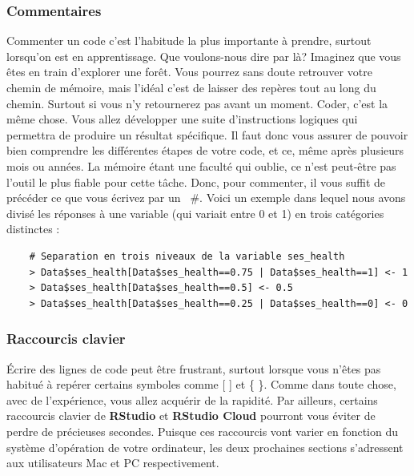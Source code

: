 \documentclass[10.5pt,a4paper]{article}
\newcommand{\rcode}[1]{\texttt{\color{rstudio} #1}}
\begin{document}
    \subsubsection{Commentaires}
    
    Commenter un code c'est l'habitude la plus importante à prendre, surtout lorsqu'on est en apprentissage. Que voulons-nous dire par là? Imaginez que vous êtes en train d'explorer une forêt. Vous pourrez sans doute retrouver votre chemin de mémoire, mais l'idéal c'est de laisser des repères tout au long du chemin. Surtout si vous n'y retournerez pas avant un moment. Coder, c'est la même chose. Vous allez développer une suite d'instructions logiques qui permettra de produire un résultat spécifique. Il faut donc vous assurer de pouvoir bien comprendre les différentes étapes de votre code, et ce, même après plusieurs mois ou années. La mémoire étant une faculté qui oublie, ce n'est peut-être pas l'outil le plus fiable pour cette tâche. Donc, pour commenter, il vous suffit de précéder ce que vous écrivez par un \rcode{$\#$}. Voici un exemple dans lequel nous avons divisé les réponses à une variable (qui variait entre 0 et 1) en trois catégories distinctes :
    
    \begin{lstlisting}
    # Separation en trois niveaux de la variable ses_health
    > Data$ses_health[Data$ses_health==0.75 | Data$ses_health==1] <- 1 
    > Data$ses_health[Data$ses_health==0.5] <- 0.5
    > Data$ses_health[Data$ses_health==0.25 | Data$ses_health==0] <- 0
    \end{lstlisting}
    
    \subsubsection{Raccourcis clavier}
    
   Écrire des lignes de code peut être frustrant, surtout lorsque vous n'êtes pas habitué à repérer certains symboles comme [ ] et \{ \}. Comme dans toute chose, avec de l'expérience, vous allez acquérir de la rapidité. Par ailleurs, certains raccourcis clavier de \textbf{RStudio} et \textbf{RStudio Cloud} pourront vous éviter de perdre de précieuses secondes. Puisque ces raccourcis vont varier en fonction du système d'opération de votre ordinateur, les deux prochaines sections s'adressent aux utilisateurs Mac et PC respectivement. 
    
\end{document}
